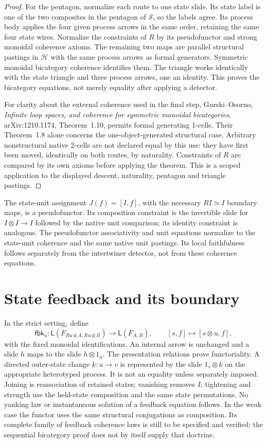 \documentclass[11pt]{article}
\begin{document}
\begin{proof}
For the pentagon, normalize each route to one state slide. Its state label is one of the two composites in the pentagon of $\mathcal S$, so the labels agree. Its process body applies the four given process arrows in the same order, retaining the same four state wires. Normalize the constraints of $R$ by its pseudofunctor and strong monoidal coherence axioms. The remaining two maps are parallel structural pastings in $\mathcal H$ with the same process arrows as formal generators. Symmetric monoidal bicategory coherence identifies them. The triangle works identically with the state triangle and three process arrows, one an identity. This proves the bicategory equations, not merely equality after applying a detector.

For clarity about the external coherence used in the final step, Gurski--Osorno, \emph{Infinite loop spaces, and coherence for symmetric monoidal bicategories}, arXiv:1210.1174, Theorem~1.10, permits formal generating 1-cells. Their Theorem~1.8 alone concerns the one-object-generated structural case. Arbitrary nonstructural native 2-cells are not declared equal by this use: they have first been moved, identically on both routes, by naturality. Constraints of $R$ are compared by its own axioms before applying the theorem. This is a scoped application to the displayed descent, naturality, pentagon and triangle pastings.
\end{proof}

The state-unit assignment $J(f)=[I,f]$, with the necessary $RI\simeq I$ boundary maps, is a pseudofunctor. Its composition constraint is the invertible slide for $I\otimes I\to I$ followed by the native unit comparison; its identity constraint is analogous. The pseudofunctor associativity and unit equations normalize to the state-unit coherence and the same native unit pastings. Its local faithfulness follows separately from the intertwiner detector, not from these coherence equations.

\section{State feedback and its boundary}
In the strict setting, define
\[
 \mathsf{fbk}_u:\mathsf L(F_{Ru\otimes A,Ru\otimes B})
       \longrightarrow\mathsf L(F_{A,B}),\qquad
 [s,f]\longmapsto[s\otimes u,f],
\]
with the fixed monoidal identifications. An internal arrow is unchanged and a slide $h$ maps to the slide $h\otimes1_u$. The presentation relations prove functoriality. A directed outer-state change $k:u\to v$ is represented by the slide $1_s\otimes k$ on the appropriate heterotyped process. It is not an equality unless separately imposed.
Joining is reassociation of retained states; vanishing removes $I$; tightening and strength use the held-state composition and the same state permutations. No yanking law or instantaneous solution of a feedback equation follows. In the weak case the functor uses the same structural conjugations as composition. Its complete family of feedback coherence laws is still to be specified and verified; the sequential bicategory proof does not by itself supply that doctrine.
\end{document}
